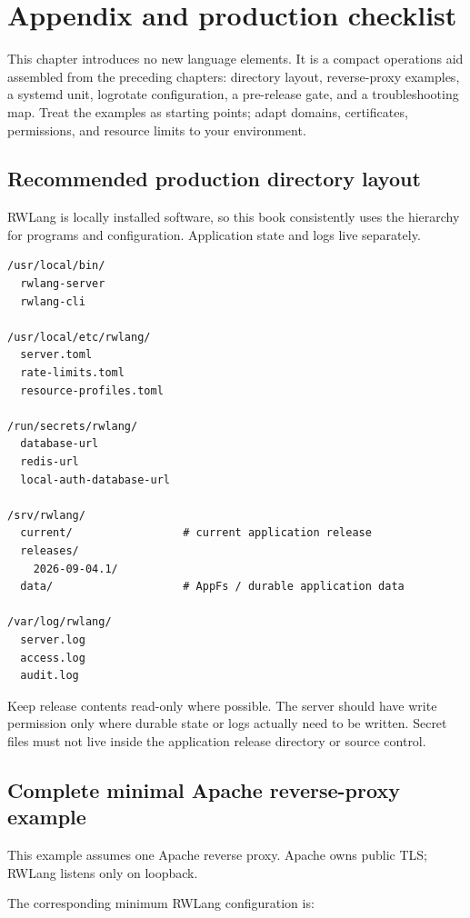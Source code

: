 \chapter{Appendix and production checklist}

This chapter introduces no new language elements. It is a compact operations aid assembled from the preceding chapters: directory layout, reverse-proxy examples, a systemd unit, logrotate configuration, a pre-release gate, and a troubleshooting map. Treat the examples as starting points; adapt domains, certificates, permissions, and resource limits to your environment.

\section{Recommended production directory layout}

RWLang is locally installed software, so this book consistently uses the  hierarchy for programs and configuration. Application state and logs live separately.

\begin{lstlisting}
/usr/local/bin/
  rwlang-server
  rwlang-cli

/usr/local/etc/rwlang/
  server.toml
  rate-limits.toml
  resource-profiles.toml

/run/secrets/rwlang/
  database-url
  redis-url
  local-auth-database-url

/srv/rwlang/
  current/                 # current application release
  releases/
    2026-09-04.1/
  data/                    # AppFs / durable application data

/var/log/rwlang/
  server.log
  access.log
  audit.log
\end{lstlisting}

Keep release contents read-only where possible. The server should have write permission only where durable state or logs actually need to be written. Secret files must not live inside the application release directory or source control.

\section{Complete minimal Apache reverse-proxy example}

This example assumes one Apache reverse proxy. Apache owns public TLS; RWLang listens only on loopback.

The corresponding minimum RWLang configuration is:

